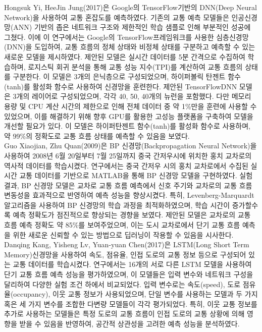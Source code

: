 \documentclass[11pt]{report}
\begin{document}
\indent Hongsuk Yi, HeeJin Jung(2017)은 Google의 TensorFlow\texttrademark 기반의 DNN(Deep Neural Network)을 사용하여 교통 혼잡도를 예측하였다. 
기존의 교통 예측 모델들은 인공신경망(ANN) 기반의 좁은 네트워크 구조와 제한적인 학습 샘플로 인해 부분적인 성공에 그쳤다. 
이에 이 연구에서는 Google의 TensorFlow\texttrademark 프레임워크를 사용한 심층신경망(DNN)을 도입하여, 교통 흐름의 정체 상태와 비정체 상태를 구분하고 예측할 수 있는 새로운 모델을 제시하였다. 
제안된 모델은 실시간 데이터를 5분 간격으로 수집하여 학습하며, 로지스틱 회귀 분석을 통해 교통 성능 지수(TPI)를 계산하여 교통 흐름의 상태를 구분한다. 
이 모델은 3개의 은닉층으로 구성되었으며, 하이퍼볼릭 탄젠트 함수(tanh)를 활성화 함수로 사용하여 신경망을 훈련한다. 
제안된 TensorFlow\texttrademark  DNN 모델은 3개의 레이어로 구성되었으며, 각각 40, 50, 40개의 뉴런을 포함했다. 
다만 메모리 용량 및 CPU 계산 시간의 제한으로 인해 전체 데이터 중 약 1\%만을 훈련에 사용할 수 있었으며, 이를 해결하기 위해 향후 GPU를 활용한 고성능 플랫폼을 구축하여 모델을 개선할 필요가 있다. 
이 모델은 하이퍼탄젠트 함수(tanh)를 활성화 함수로 사용하며, 약 99\%의 정확도로 교통 흐름 상태를 예측할 수 있음을 보였다. \\
\indent Guo Xiaojian, Zhu Quan(2009)은 BP 신경망(Backpropagation Neural Network)을 사용하여 2008년 6월 20일부터 7월 25일까지 중국 간저우시에 위치한 홍치 교차로의 역사적 데이터를 학습시켰다. 
연구에서는 중국 간저우 시의 홍치 교차로에서 수집된 실시간 교통 데이터를 기반으로 MATLAB을 통해 BP 신경망 모델을 구현하였다. 
실험 결과, BP 신경망 모델은 교차로 교통 흐름 예측에서 신호 주기와 교차로의 교통 흐름 변동성을 효과적으로 반영하여 예측 성능을 향상시켰다. 
특히, Levenberg-Marquardt 알고리즘을 사용하여 BP 신경망의 학습 과정을 최적화하였으며, 학습 시간이 증가할수록 예측 정확도가 점진적으로 향상되는 경향을 보였다.
제안된 모델은 교차로의 교통 흐름 예측 정확도 약 85\%를 보여주었으며, 이는 도시 교차로에서 단기 교통 흐름 예측을 위한 새로운 신뢰할 수 있는 방법으로 딥러닝이 작용할 수 있음을 시사한다. \\
\indent Danqing Kang, Yisheng Lv, Yuan-yuan Chen(2017)은 LSTM(Long Short Term Memory)신경망을 사용하여 속도, 점유율, 인접 도로의 교통 정보 등으로 구성되어 있는 교통 데이터를 학습시켰다. 
연구에서는 16개의 서로 다른 LSTM 모델을 사용하여 단기 교통 흐름 예측 성능을 평가하였으며, 이 모델들은 입력 변수와 네트워크 구성을 달리하여 다양한 실험 조건 하에서 비교되었다. 
입력 변수로는 속도(speed), 도로 점유율(occupancy), 이웃 교통 정보가 사용되었으며, 단일 변수를 사용하는 모델과 두 가지 혹은 세 가지 변수를 조합한 다변량 모델들이 각각 평가되었다. 
특히, 이웃 교통 정보를 추가로 사용하는 모델들은 특정 도로의 교통 흐름이 인접 도로의 교통 상황에 의해 영향을 받을 수 있음을 반영하여, 공간적 상관성을 고려한 예측 성능을 분석하였다. 
\end{document}
